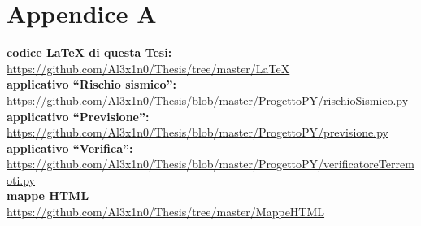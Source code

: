 \chapter*{Appendice A}

\textbf{codice LaTeX di questa Tesi:}\\
\url{https://github.com/Al3x1n0/Thesis/tree/master/LaTeX}\\
\textbf{applicativo ``Rischio sismico'':}\\
\url{https://github.com/Al3x1n0/Thesis/blob/master/ProgettoPY/rischioSismico.py}\\
\textbf{applicativo ``Previsione'':}\\
\url{https://github.com/Al3x1n0/Thesis/blob/master/ProgettoPY/previsione.py}
\textbf{applicativo ``Verifica'':}\\
\url{https://github.com/Al3x1n0/Thesis/blob/master/ProgettoPY/verificatoreTerremoti.py}\\
\textbf{mappe HTML}\\
\url{https://github.com/Al3x1n0/Thesis/tree/master/MappeHTML}